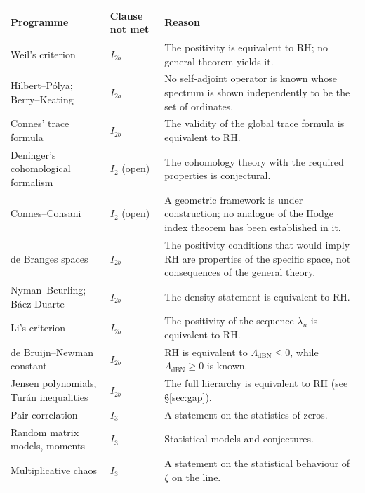 \documentclass[11pt]{amsart}
\theoremstyle{definition}
\theoremstyle{remark}
\begin{document}
\begin{table}[ht]
\small
\begin{tabular}{>{\raggedright\arraybackslash}p{4.7cm}>{\raggedright\arraybackslash}p{1.5cm}>{\raggedright\arraybackslash}p{8.6cm}}
\hline
Programme & Clause not met & Reason \\
\hline
Weil's criterion \cite{Weil52,bgBombieri00} & $I_{2b}$ &
The positivity is equivalent to RH; no general theorem yields it.\\
Hilbert--P\'olya; Berry--Keating \cite{BerryKeating99} & $I_{2a}$ &
No self-adjoint operator is known whose spectrum is shown independently to be
the set of ordinates.\\
Connes' trace formula \cite{bgConnes99} & $I_{2b}$ &
The validity of the global trace formula is equivalent to RH.\\
Deninger's cohomological formalism \cite{Deninger98} & $I_2$ (open) &
The cohomology theory with the required properties is conjectural.\\
Connes--Consani \cite{ConnesConsani21} & $I_2$ (open) &
A geometric framework is under construction; no analogue of the Hodge index
theorem has been established in it.\\
de Branges spaces \cite{bgdeBranges} & $I_{2b}$ &
The positivity conditions that would imply RH are properties of the specific
space, not consequences of the general theory.\\
Nyman--Beurling; B\'aez-Duarte \cite{Beurling55,BaezDuarte03} & $I_{2b}$ &
The density statement is equivalent to RH.\\
Li's criterion \cite{Li97} & $I_{2b}$ &
The positivity of the sequence $\lambda_n$ is equivalent to RH.\\
de Bruijn--Newman constant \cite{deBruijn50,Newman76,RodgersTao20} & $I_{2b}$ &
RH is equivalent to $\Lambda_{\mathrm{dBN}}\le0$, while
$\Lambda_{\mathrm{dBN}}\ge0$ is known.\\
Jensen polynomials, Tur\'an inequalities \cite{Polya27,CNV86,GORZ19} & $I_{2b}$ &
The full hierarchy is equivalent to RH (see \S\ref{sec:gap}).\\
Pair correlation \cite{bgMont73} & $I_3$ &
A statement on the statistics of zeros.\\
Random matrix models, moments \cite{bgKS,KeatingSnaith00} & $I_3$ &
Statistical models and conjectures.\\
Multiplicative chaos \cite{SaksmanWebb20} & $I_3$ &
A statement on the statistical behaviour of $\zeta$ on the line.\\

\end{tabular}
\end{table}
\end{document}
